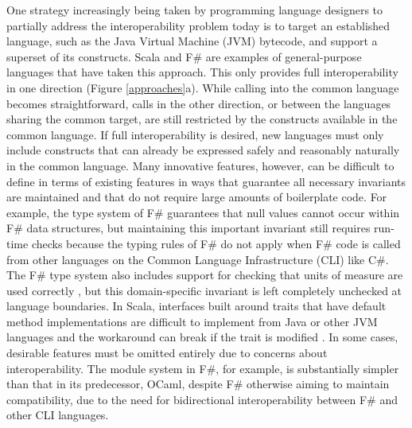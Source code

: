 One strategy increasingly being taken by programming language designers to partially address the interoperability problem today is to target an established language, such as the Java Virtual Machine (JVM) bytecode, and support a superset of its constructs. Scala \cite{scala} and F\# \cite{fsharp} are examples of general-purpose languages that have taken this approach. This only provides full interoperability in one direction (Figure \ref{approaches}a). While calling into the common language becomes straightforward, calls in the other direction, or between the languages sharing the common target, are still restricted by the constructs available in the common language. If full interoperability is desired, new languages must only include constructs that can already be expressed safely and reasonably naturally in the common language. Many innovative features, however, can be difficult to define in terms of existing features in ways that guarantee all necessary invariants are maintained and that do not require large amounts of boilerplate code. For example, the type system of F\# guarantees that null values cannot occur within F\# data structures, but maintaining this important invariant still requires run-time checks because the typing rules of F\# do not apply when F\# code is called from other languages on the Common Language Infrastructure (CLI) like C\#. The F\# type system also includes support for checking that units of measure are used correctly \cite{fsharpunits}, but this domain-specific invariant is left completely unchecked at language boundaries. In Scala, interfaces built around traits that have default method implementations are difficult to implement from Java or other JVM languages and the workaround can break if the trait is modified \cite{scalatraitinterop}. In some cases, desirable features must be omitted entirely due to concerns about  interoperability. The module system in F\#, for example, is substantially simpler than that in its predecessor, OCaml, despite F\# otherwise aiming to maintain compatibility, due to the need for bidirectional interoperability between F\# and other CLI languages.

